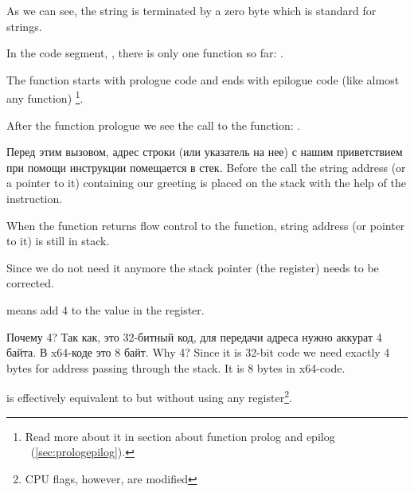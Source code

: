 {As we can see, the string is terminated by a zero byte which is standard for \CCpp strings.}

{In the code segment, , there is only one function so far}: \main.

{The function \main starts with prologue code and ends with epilogue code (like almost any function)}
\footnote{
{Read more about it in section about function prolog and epilog}
~(\ref{sec:prologepilog}).}.

{After the function prologue we see the call to the \printf function}: . 

\IFRU
{Перед этим вызовом, адрес строки (или указатель на нее) с нашим приветствием при помощи инструкции \PUSH помещается в стек.}
{Before the call the string address (or a pointer to it) containing our greeting is placed on the stack with the help of the \PUSH instruction.}

{When the \printf function returns flow control to the \main function, string address (or pointer to it) is still in stack.}

{Since we do not need it anymore the stack pointer (the \ESP register) needs to be corrected.}

 
{means add 4 to the value in the \ESP register.}

\IFRU
{Почему 4? Так как, это 32-битный код, для передачи адреса нужно аккурат 4 байта. В x64-коде это 8 байт.}
{Why 4? Since it is 32-bit code we need exactly 4 bytes for address passing through the stack. 
It is 8 bytes in x64-code.}

 
{is effectively equivalent to  but without using any register\footnote{CPU flags, however, are modified}.}

